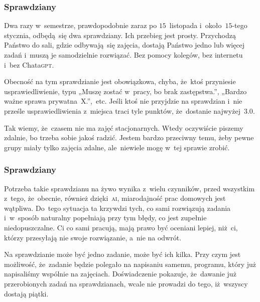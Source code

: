 \documentclass[10pt,t]{beamer}
\begin{document}
\begin{frame}
  \frametitle{Sprawdziany}


  Dwa razy w~semestrze, prawdopodobnie zaraz po $15$~listopada
  i~około~$15$-tego stycznia, odbędą~się dwa sprawdziany. Ich przebieg jest
  prosty. Przychodzą Państwo do sali, gdzie odbywają~się zajęcia, dostają
  Państwo jedno lub więcej zadań i~muszą je samodzielnie rozwiązać. Bez
  pomocy kolegów, bez internetu i~bez Chata\textsc{gpt}.

  Obecność na tym sprawdzianie jest obowiązkowa, chyba, że~ktoś przyniesie
  usprawiedliwienie, typu „Muszę zostać w~pracy, bo brak zastępstwa.”,
  „Bardzo ważne sprawa prywatna~X.”,~etc. Jeśli ktoś nie przyjdzie na
  sprawdzian i~\alert{nie} prześle usprawiedliwienia z~miejsca traci tyle
  punktów, że~dostanie najwyżej~$3.0$.

  Tak wiemy, że~czasem \alert{nie ma zajęć stacjonarnych}. Wtedy oczywiście
  piszemy zdalnie, bo trzeba sobie jakoś radzić. Jestem bardzo przeciwny
  temu, żeby pewne grupy miały tylko zajęcia zdalne, ale~niewiele mogę
  w~tej sprawie zrobić.

\end{frame}





\begin{frame}
  \frametitle{Sprawdziany}


  Potrzeba takie sprawdzianu na żywo wynika z~wielu czynników, przed
  wszystkim z~tego, że~obecnie, również dzięki~\textsc{ai}, miarodajność
  prac domowych jest wątpliwa. Do~tego sytuacja ta krzywdzi tych, co sami
  rozwiązują zadania i~w~sposób naturalny popełniają przy tym błędy, co
  jest zupełnie niedopuszczalne. Ci co sami pracują, mają prawo być
  oceniani lepiej, niż~ci, którzy przesyłają nie swoje rozwiązanie,
  a~nie na odwrót.

  Na sprawdzianie może być jedno zadanie, może być ich kilka. Przy czym jest
  możliwość, że~zadanie będzie polegało na napisaniu samemu, programu,
  który już napisaliśmy wspólnie na zajęciach. Doświadczenie pokazuje,
  że~dawanie już przerobionych zadań na sprawdzianach, wcale nie
  prowadzi do tego, iż~wszyscy dostają piątki.

\end{frame}
\end{document}
